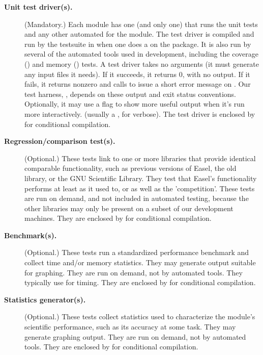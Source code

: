 \begin{description} 

\item[\textbf{Unit test driver(s).}] (Mandatory.) Each module has one (and only one)
   that runs the unit tests and any other automated for
  the module. The test driver is compiled and run by the testsuite in
   when one does a 
  on the package. It is also run by several of the automated tools
  used in development, including the coverage () and
  memory () tests. A test driver takes no arguments
  (it must generate any input files it needs). If it succeeds, it
  returns 0, with no output. If it fails, it returns nonzero and calls
   to issue a short error message on
  . Our test harness, , depends on these
  output and exit status conventions. Optionally, it may use a flag
  to show more useful output when it's run more interactively.
  (usually a , for verbose).
  The test driver is enclosed by
   for
  conditional compilation.

\item[\textbf{Regression/comparison test(s).}] (Optional.) These tests
  link to one or more libraries that provide identical comparable
  functionality, such as previous versions of Easel, the old
   library,  or the GNU Scientific Library.
  They test that Easel's functionality performs at least as it used
  to, or as well as the 'competition'. These tests are run on demand,
  and not included in automated testing, because the other libraries
  may only be present on a subset of our development machines. They
  are enclosed by  for conditional
  compilation.

\item[\textbf{Benchmark(s).}] (Optional.) These tests run a
  standardized performance benchmark and collect time and/or memory
  statistics. They may generate output suitable for graphing. They are
  run on demand, not by automated tools. They typically use 
   for timing. They are enclosed by
    for
  conditional compilation.

\item[\textbf{Statistics generator(s).}] (Optional.) These tests collect
  statistics used to characterize the module's scientific performance,
  such as its accuracy at some task. They may generate graphing
  output. They are run on demand, not by automated tools. They are
  enclosed by 
  for conditional compilation.


\end{description}
